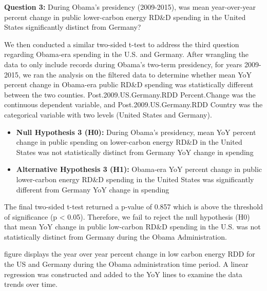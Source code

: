\documentclass[
  12pt,
]{article}
\begin{document}
\textbf{Question 3:} During Obama's presidency (2009-2015), was mean
year-over-year percent change in public lower-carbon energy RD\&D
spending in the United States significantly distinct from Germany?

We then conducted a similar two-sided t-test to address the third
question regarding Obama-era spending in the U.S. and Germany. After
wrangling the data to only include records during Obama's two-term
presidency, for years 2009-2015, we ran the analysis on the filtered
data to determine whether mean YoY percent change in Obama-era public
RD\&D spending was statistically different between the two counties.
Post.2009.US.Germany.RDD Percent.Change was the continuous dependent
variable, and Post.2009.US.Germany.RDD Country was the categorical
variable with two levels (United States and Germany).

\begin{itemize}
\item
  \textbf{Null Hypothesis 3 (H0):} During Obama's presidency, mean YoY
  percent change in public spending on lower-carbon energy RD\&D in the
  United States was not statistically distinct from Germany YoY change
  in spending
\item
  \textbf{Alternative Hypothesis 3 (H1):} Obama-era YoY percent change
  in public lower-carbon energy RD\&D spending in the United States was
  significantly different from Germany YoY change in spending
\end{itemize}

The final two-sided t-test returned a p-value of 0.857 which is above
the threshold of significance (p \textless{} 0.05). Therefore, we fail
to reject the null hypothesis (H0) that mean YoY change in public
low-carbon RD\&D spending in the U.S. was not statistically distinct
from Germany during the Obama Administration.

figure displays the year over year percent change in low carbon energy
RDD for the US and Germany during the Obama administration time period.
A linear regression was constructed and added to the YoY lines to
examine the data trends over time.
\end{document}
